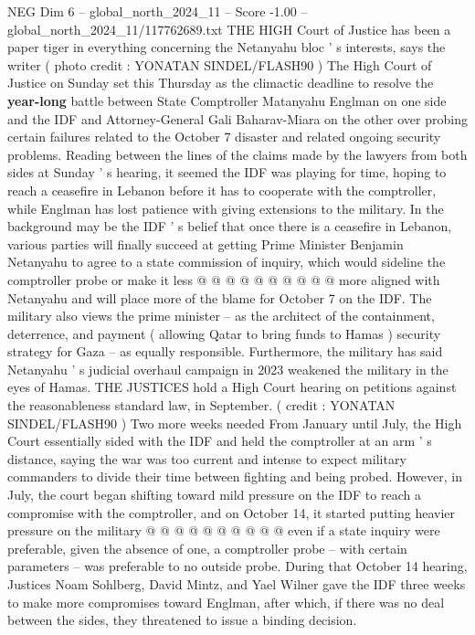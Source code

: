 \begin{textsample}{NEG Dim 6 – global\_north\_2024\_11 – Score -1.00 – global\_north\_2024\_11/117762689.txt}  \label{ex:f6_neg_102}
THE HIGH Court of Justice has been a paper tiger in everything concerning the Netanyahu bloc ' s interests, says the writer ( photo credit : YONATAN SINDEL/FLASH90 ) The High Court of Justice on Sunday set this Thursday as the climactic deadline to resolve the \textbf{year-long} battle between State Comptroller Matanyahu Englman on one side and the IDF and Attorney-General Gali Baharav-Miara on the other over probing certain failures related to the October 7 disaster and related ongoing security problems.
Reading between the lines of the claims made by the lawyers from both sides at Sunday ' s hearing, it seemed the IDF was playing for time, hoping to reach a ceasefire in Lebanon before it has to cooperate with the comptroller, while Englman has lost patience with giving extensions to the military.
In the background may be the IDF ' s belief that once there is a ceasefire in Lebanon, various parties will finally succeed at getting Prime Minister Benjamin Netanyahu to agree to a state commission of inquiry, which would sideline the comptroller probe or make it less @ @ @ @ @ @ @ @ @ @ more aligned with Netanyahu and will place more of the blame for October 7 on the IDF.
The military also views the prime minister -- as the architect of the containment, deterrence, and payment ( allowing Qatar to bring funds to Hamas ) security strategy for Gaza -- as equally responsible.
Furthermore, the military has said Netanyahu ' s judicial overhaul campaign in 2023 weakened the military in the eyes of Hamas.
THE JUSTICES hold a High Court hearing on petitions against the reasonableness standard law, in September. ( credit : YONATAN SINDEL/FLASH90 ) Two more weeks needed From January until July, the High Court essentially sided with the IDF and held the comptroller at an arm ' s distance, saying the war was too current and intense to expect military commanders to divide their time between fighting and being probed.
However, in July, the court began shifting toward mild pressure on the IDF to reach a compromise with the comptroller, and on October 14, it started putting heavier pressure on the military @ @ @ @ @ @ @ @ @ @ even if a state inquiry were preferable, given the absence of one, a comptroller probe -- with certain parameters -- was preferable to no outside probe.
During that October 14 hearing, Justices Noam Sohlberg, David Mintz, and Yael Wilner gave the IDF three weeks to make more compromises toward Englman, after which, if there was no deal between the sides, they threatened to issue a binding decision.

\end{textsample}

